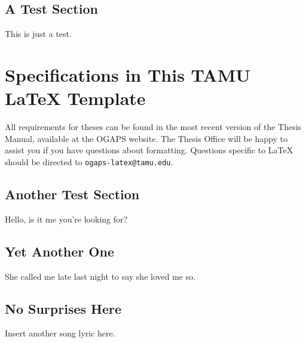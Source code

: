 \subsection{A Test Section}

This is just a test.

\section{Specifications in This TAMU \LaTeX{} Template}

All requirements for theses can be found in the most recent version of the Thesis Manual, available at the \ac{OGAPS} website. The Thesis Office will be happy to assist you if you have questions about formatting. Questions specific to \LaTeX{} should be directed to \texttt{ogaps-latex@tamu.edu}.

\subsection{Another Test Section}
 
Hello, is it me you're looking for?

\subsection{Yet Another One}
She called me late last night to say she loved me so.
 
 \subsection{No Surprises Here}
 Insert another song lyric here.

